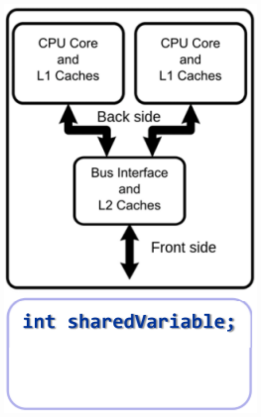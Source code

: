 \begin{minipage}[c]{3cm}
	\includegraphics[width=1.5\textwidth]{images/Multicore/Multicore_shared_variable}
\end{minipage}

